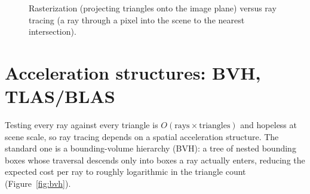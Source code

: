 \begin{figure}[tbp]
\centering
{}
\caption[Rasterization versus ray tracing]{Rasterization (projecting triangles onto the image plane) versus ray tracing (a ray through
a pixel into the scene to the nearest intersection).}
\label{fig:rastervsrt}
\end{figure}

\section{Acceleration structures: BVH, TLAS/BLAS}
\label{sec:accel-pregled}

Testing every ray against every triangle is $O(\text{rays} \times \text{triangles})$ and hopeless at
scene scale, so ray tracing depends on a spatial acceleration structure. The standard one is a
bounding-volume hierarchy (BVH): a tree of nested bounding boxes whose traversal descends only into
boxes a ray actually enters, reducing the expected cost per ray to roughly logarithmic in the
triangle count (Figure~\ref{fig:bvh}).

